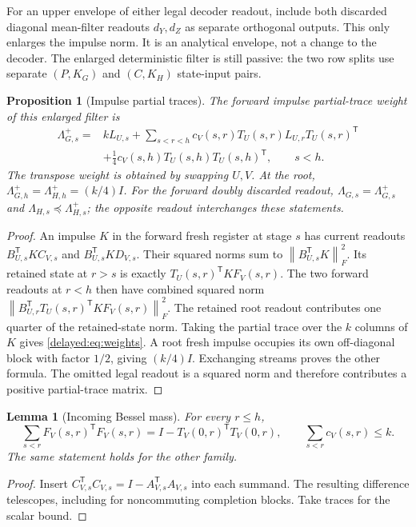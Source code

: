\documentclass[11pt,oneside,openany,a4paper]{book}
\numberwithin{equation}{chapter}
\newtheorem{lemma}[theorem]{Lemma}
\newtheorem{proposition}[theorem]{Proposition}
\theoremstyle{definition}
\theoremstyle{remark}
\newcommand{\T}{\mathsf T}\newcommand{\Id}{I}
\newcommand{\F}[1]{\left\lVert#1\right\rVert_F}
\begin{document}
For an upper envelope of either legal decoder readout, include both
discarded diagonal mean-filter readouts $d_Y,d_Z$ as separate orthogonal
outputs. This only enlarges the impulse norm. It is an analytical
envelope, not a change to the decoder. The enlarged deterministic
filter is still passive: the two row splits use separate $(P,K_G)$
and $(C,K_H)$ state-input pairs.

\begin{proposition}[Impulse partial traces]\label{delayed:prop:weights}
The forward impulse partial-trace weight of this enlarged filter is
\begin{align}
 \Lambda^+_{G,s}={}&kL_{U,s}
 +\sum_{s<r<h}c_V(s,r)T_U(s,r)L_{U,r}T_U(s,r)^{\T}\\
 &+\frac14c_V(s,h)T_U(s,h)T_U(s,h)^{\T},\qquad s<h.
 \label{delayed:eq:weights}
\end{align}
The transpose weight is obtained by swapping $U,V$. At the root,
$\Lambda^+_{G,h}=\Lambda^+_{H,h}=(k/4)I$.
For the forward doubly discarded readout,
$\Lambda_{G,s}=\Lambda^+_{G,s}$ and
$\Lambda_{H,s}\preceq\Lambda^+_{H,s}$; the opposite readout
interchanges these statements.
\end{proposition}
\begin{proof}
An impulse $K$ in the forward fresh register at stage $s$ has current
readouts $B_{U,s}^{\T}KC_{V,s}$ and
$B_{U,s}^{\T}KD_{V,s}$. Their squared norms sum to
$\F{B_{U,s}^{\T}K}^2$. Its retained state at $r>s$ is exactly
$T_U(s,r)^{\T}KF_V(s,r)$. The two forward readouts at $r<h$
then have combined squared norm
$\F{B_{U,r}^{\T}T_U(s,r)^{\T}KF_V(s,r)}^2$.
The retained root readout contributes one quarter of the retained-state
norm. Taking the partial trace over the $k$ columns of $K$ gives
\eqref{delayed:eq:weights}. A root fresh impulse occupies its own off-diagonal
block with factor $1/2$, giving $(k/4)I$. Exchanging streams proves
the other formula. The omitted legal readout is a squared norm and
therefore contributes a positive partial-trace matrix.
\end{proof}

\begin{lemma}[Incoming Bessel mass]\label{delayed:lem:bessel}
For every $r\le h$,
\[
 \sum_{s<r}F_V(s,r)^{\T}F_V(s,r)
 =I-T_V(0,r)^{\T}T_V(0,r),
 \qquad \sum_{s<r}c_V(s,r)\le k.
\]
The same statement holds for the other family.
\end{lemma}
\begin{proof}
Insert $C_{V,s}^{\T}C_{V,s}=I-A_{V,s}^{\T}A_{V,s}$ into
each summand. The resulting difference telescopes, including for
noncommuting completion blocks. Take traces for the scalar bound.
\end{proof}
\end{document}
